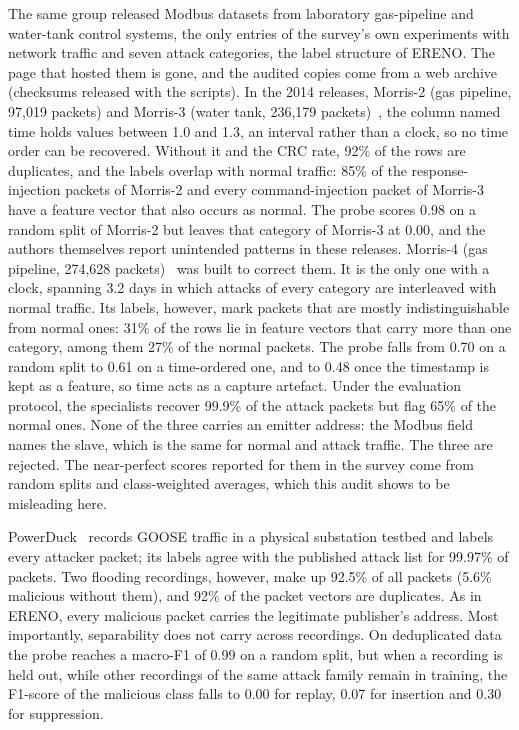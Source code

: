 The same group released Modbus datasets from laboratory gas-pipeline and water-tank
control systems, the only entries of the survey's own experiments with network traffic
and seven attack categories, the label structure of ERENO. The page that hosted them is
gone, and the audited copies come from a web archive (checksums released with the
scripts). In the 2014 releases, Morris-2 (gas pipeline, 97{,}019 packets) and Morris-3
(water tank, 236{,}179 packets)~\cite{morris2014icsdatasets}, the column named time holds
values between 1.0 and 1.3, an interval rather than a clock, so no time order can be
recovered. Without it and the CRC rate, 92\% of the rows are duplicates, and the labels
overlap with normal traffic: 85\% of the response-injection packets of Morris-2 and every
command-injection packet of Morris-3 have a feature vector that also occurs as normal. The
probe scores 0.98 on a random split of Morris-2 but leaves that category of Morris-3 at
0.00, and the authors themselves report unintended patterns in these releases. Morris-4
(gas pipeline, 274{,}628 packets)~\cite{turnipseed2015scada} was built to correct them. It
is the only one with a clock, spanning 3.2 days in which attacks of every category are
interleaved with normal traffic. Its labels, however, mark packets that are mostly
indistinguishable from normal ones: 31\% of the rows lie in feature vectors that carry
more than one category, among them 27\% of the normal packets. The probe falls from 0.70
on a random split to 0.61 on a time-ordered one, and to 0.48 once the timestamp is kept as
a feature, so time acts as a capture artefact. Under the evaluation protocol, the
specialists recover 99.9\% of the attack packets but flag 65\% of the normal ones. None of
the three carries an emitter address: the Modbus field names the slave, which is the same
for normal and attack traffic. The three are rejected. The near-perfect scores reported for
them in the survey come from random splits and class-weighted averages, which this audit
shows to be misleading here.

PowerDuck~\cite{zemanek2022powerduck} records GOOSE traffic in a physical substation
testbed and labels every attacker packet; its labels agree with the published attack list
for 99.97\% of packets. Two flooding recordings, however, make up 92.5\% of all packets
(5.6\% malicious without them), and 92\% of the packet vectors are duplicates. As in
ERENO, every malicious packet carries the legitimate publisher's address. Most
importantly, separability does not carry across recordings. On deduplicated data the
probe reaches a macro-F1 of 0.99 on a random split, but when a recording is held out,
while other recordings of the same attack family remain in training, the F1-score of the
malicious class falls to 0.00 for replay, 0.07 for insertion and 0.30 for suppression.

